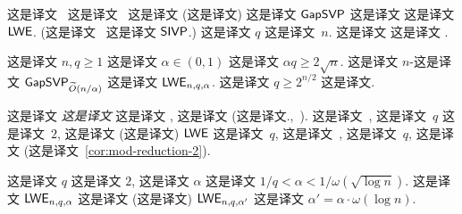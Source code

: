  这是译文~\cite{DBLP:journals/jacm/Regev09} 这是译文~\cite{DBLP:conf/stoc/Peikert09} 这是译文 (这是译文) 这是译文 $\mathsf{GapSVP}$ 这是译文 这是译文 $\mathsf{LWE}$.  (这是译文~\cite{DBLP:journals/jacm/Regev09} 这是译文 $\mathsf{SIVP}$.) 这是译文 $q$ 这是译文~$n$. 这是译文 {{\cite[Theorem~3.1]{DBLP:journals/jacm/Regev09}}} 这是译文 {{\cite[Theorem~3.1]{DBLP:conf/stoc/Peikert09}}}.

\begin{theorem}\label{thm:worstcaseaveragecase} 这是译文 $n, q \ge 1$ 这是译文 $\alpha \in (0,1)$ 这是译文 $\alpha q \ge 2 \sqrt{n}$. 这是译文 $n$-这是译文 $\mathsf{GapSVP}_{\widetilde{O}(n/\alpha)}$ 这是译文 $\mathsf{LWE}_{n,q,\alpha}$. 这是译文 $q \ge 2^{n/2}$ 这是译文. 
\end{theorem}

这是译文 \emph{这是译文} 这是译文 \lwe, 这是译文 (这是译文.,~\cite{DBLP:journals/jacm/Regev09,DBLP:conf/stoc/Peikert09,DBLP:conf/eurocrypt/MicciancioP12}). 这是译文~\cite{DBLP:conf/eurocrypt/MicciancioP12}, 这是译文~$q$ 这是译文~$2$, 这是译文 (这是译文) $\mathsf{LWE}$ 这是译文~$q$, 这是译文~\cite{DBLP:conf/eurocrypt/MicciancioP12}, 这是译文~$q$, 这是译文 (这是译文~\ref{cor:mod-reduction-2}).

\begin{theorem}\label{thm:searchtodecisionmicpei} 这是译文 $q$ 这是译文 $2$, 这是译文 $\alpha$ 这是译文 $1/q < \alpha < 1/\omega(\sqrt{\log n})$. 这是译文 $\mathsf{LWE}_{n,q,\alpha}$ 这是译文 (这是译文) $\mathsf{LWE}_{n,q,\alpha'}$ 这是译文 $\alpha'=\alpha \cdot \omega(\log n)$.
\end{theorem}





